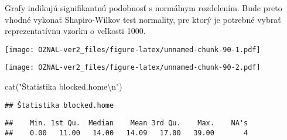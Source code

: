 \documentclass[
]{article}
\newenvironment{Shaded}{\begin{snugshade}}{\end{snugshade}}
\newcommand{\AttributeTok}[1]{\textcolor[rgb]{0.77,0.63,0.00}{#1}}
\newcommand{\DecValTok}[1]{\textcolor[rgb]{0.00,0.00,0.81}{#1}}
\newcommand{\FunctionTok}[1]{\textcolor[rgb]{0.00,0.00,0.00}{#1}}
\newcommand{\NormalTok}[1]{#1}
\newcommand{\OtherTok}[1]{\textcolor[rgb]{0.56,0.35,0.01}{#1}}
\newcommand{\SpecialCharTok}[1]{\textcolor[rgb]{0.00,0.00,0.00}{#1}}
\newcommand{\StringTok}[1]{\textcolor[rgb]{0.31,0.60,0.02}{#1}}
\begin{document}
Grafy indikujú signifikantnú podobnosť s normálnym rozdelením. Bude
preto vhodné vykonať Shapiro-Wilkov test normality, pre ktorý je
potrebné vybrať reprezentatívnu vzorku o veľkosti 1000.

\begin{Shaded}
\end{Shaded}

\texttt{[image: OZNAL-ver2\_files/figure-latex/unnamed-chunk-90-1.pdf]}

\begin{Shaded}
\end{Shaded}

\texttt{[image: OZNAL-ver2\_files/figure-latex/unnamed-chunk-90-2.pdf]}

\begin{Shaded}
\begin{Highlighting}[]
\FunctionTok{cat}\NormalTok{(}\StringTok{"Štatistika blocked.home}\SpecialCharTok{\textbackslash{}n}\StringTok{"}\NormalTok{)}
\end{Highlighting}
\end{Shaded}

\begin{verbatim}
## Štatistika blocked.home
\end{verbatim}

\begin{Shaded}
\end{Shaded}

\begin{verbatim}
##    Min. 1st Qu.  Median    Mean 3rd Qu.    Max.    NA's 
##    0.00   11.00   14.00   14.09   17.00   39.00       4
\end{verbatim}
\end{document}
